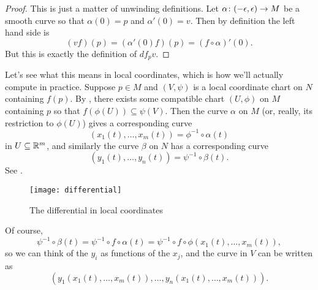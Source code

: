 \begin{proof}
	This is just a matter of unwinding definitions. Let $\alpha\colon\thinspace\! (-\epsilon, \epsilon) \to M$ be a smooth curve so that $\alpha(0) = p$ and $\alpha'(0) = v$. Then by definition the left hand side is
	\[
		(vf)(p) = (\alpha'(0)f)(p) = (f \circ \alpha)'(0).
	\]
	But this is exactly the definition of $df_p v$.
\end{proof}

Let's see what this means in local coordinates, which is how we'll actually compute in practice. Suppose $p \in M$ and $(V, \psi)$ is a local coordinate chart on $N$ containing $f(p)$. By , there exists some compatible chart $(U, \phi)$ on $M$ containing $p$ so that $f(\phi(U)) \subseteq \psi(V)$. Then the curve $\alpha$ on $M$ (or, really, its restriction to $\phi(U)$) gives a corresponding curve
\[
	(x_1(t), \dots , x_m(t)) = \phi^{-1} \circ \alpha(t)
\]
in $U \subseteq \mathbb{R}^m$, and similarly the curve $\beta$ on $N$ has a corresponding curve
\[
	(y_1(t), \dots , y_n(t)) = \psi^{-1} \circ \beta(t).
\]
See .

\begin{figure}[htbp]
	\centering
		\texttt{[image: differential]}
	\caption{The differential in local coordinates}
	\label{fig:differential}
\end{figure}

Of course,
\[
	\psi^{-1} \circ \beta(t) = \psi^{-1} \circ f \circ \alpha(t) = \psi^{-1} \circ f \circ \phi(x_1(t), \dots , x_m(t)),
\]
so we can think of the $y_i$ as functions of the $x_j$, and the curve in $V$ can be written as
\[
	(y_1(x_1(t),\dots , x_m(t)), \dots , y_n(x_1(t), \dots , x_m(t))).
\]


